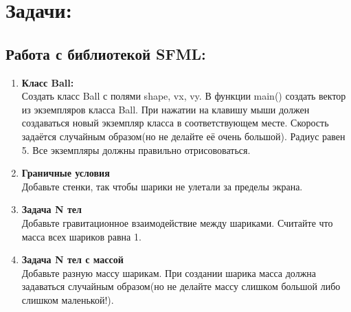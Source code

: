 \documentclass{article}
\begin{document}



\section*{Задачи:}


\subsection*{Работа с библиотекой SFML:}
\begin{enumerate}
\item \textbf{Класс Ball:} \\
Создать класс Ball с полями shape, vx, vy. В функции main() создать вектор из экземпляров класса Ball. При нажатии на клавишу мыши должен создаваться новый экземпляр класса в соответствующем месте. Скорость задаётся случайным образом(но не делайте её очень большой). Радиус равен 5. Все экземпляры должны правильно отрисововаться.
\item \textbf{Граничные условия} \\
Добавьте стенки, так чтобы шарики не улетали за пределы экрана.
\item \textbf{Задача N тел} \\
Добавьте гравитационное взаимодействие между шариками. Считайте что масса всех шариков равна 1.
\item \textbf{Задача N тел с массой} \\
Добавьте разную массу шарикам. При создании шарика масса должна задаваться случайным образом(но не делайте массу слишком большой либо слишком маленькой!).
\end{enumerate}
\end{document}
